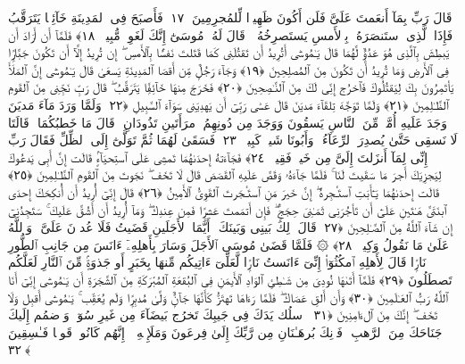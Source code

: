  قَالَ رَبِّ بِمَآ أَنعَمتَ عَلَىَّ فَلَن أَكُونَ ظَهِيرًۭا لِّلمُجرِمِينَ ﴿١٧﴾
 فَأَصبَحَ فِى ٱلمَدِينَةِ خَآئِفًۭا يَتَرَقَّبُ فَإِذَا ٱلَّذِى ٱستَنصَرَهُۥ بِٱلأَمسِ يَستَصرِخُهُۥ ۚ قَالَ لَهُۥ مُوسَىٰٓ إِنَّكَ لَغَوِىٌّۭ مُّبِينٌۭ ﴿١٨﴾
 فَلَمَّآ أَن أَرَادَ أَن يَبطِشَ بِٱلَّذِى هُوَ عَدُوٌّۭ لَّهُمَا قَالَ يَـٰمُوسَىٰٓ أَتُرِيدُ أَن تَقتُلَنِى كَمَا قَتَلتَ نَفسًۢا بِٱلأَمسِ ۖ إِن تُرِيدُ إِلَّآ أَن تَكُونَ جَبَّارًۭا فِى ٱلأَرضِ وَمَا تُرِيدُ أَن تَكُونَ مِنَ ٱلمُصلِحِينَ ﴿١٩﴾
 وَجَآءَ رَجُلٌۭ مِّن أَقصَا ٱلمَدِينَةِ يَسعَىٰ قَالَ يَـٰمُوسَىٰٓ إِنَّ ٱلمَلَأَ يَأتَمِرُونَ بِكَ لِيَقتُلُوكَ فَٱخرُج إِنِّى لَكَ مِنَ ٱلنَّـٰصِحِينَ ﴿٢٠﴾
 فَخَرَجَ مِنهَا خَآئِفًۭا يَتَرَقَّبُ ۖ قَالَ رَبِّ نَجِّنِى مِنَ ٱلقَومِ ٱلظَّـٰلِمِينَ ﴿٢١﴾
 وَلَمَّا تَوَجَّهَ تِلقَآءَ مَديَنَ قَالَ عَسَىٰ رَبِّىٓ أَن يَهدِيَنِى سَوَآءَ ٱلسَّبِيلِ ﴿٢٢﴾
 وَلَمَّا وَرَدَ مَآءَ مَديَنَ وَجَدَ عَلَيهِ أُمَّةًۭ مِّنَ ٱلنَّاسِ يَسقُونَ وَوَجَدَ مِن دُونِهِمُ ٱمرَأَتَينِ تَذُودَانِ ۖ قَالَ مَا خَطبُكُمَا ۖ قَالَتَا لَا نَسقِى حَتَّىٰ يُصدِرَ ٱلرِّعَآءُ ۖ وَأَبُونَا شَيخٌۭ كَبِيرٌۭ ﴿٢٣﴾
 فَسَقَىٰ لَهُمَا ثُمَّ تَوَلَّىٰٓ إِلَى ٱلظِّلِّ فَقَالَ رَبِّ إِنِّى لِمَآ أَنزَلتَ إِلَىَّ مِن خَيرٍۢ فَقِيرٌۭ ﴿٢٤﴾
 فَجَآءَتهُ إِحدَىٰهُمَا تَمشِى عَلَى ٱستِحيَآءٍۢ قَالَت إِنَّ أَبِى يَدعُوكَ لِيَجزِيَكَ أَجرَ مَا سَقَيتَ لَنَا ۚ فَلَمَّا جَآءَهُۥ وَقَصَّ عَلَيهِ ٱلقَصَصَ قَالَ لَا تَخَف ۖ نَجَوتَ مِنَ ٱلقَومِ ٱلظَّـٰلِمِينَ ﴿٢٥﴾
 قَالَت إِحدَىٰهُمَا يَـٰٓأَبَتِ ٱستَـٔجِرهُ ۖ إِنَّ خَيرَ مَنِ ٱستَـٔجَرتَ ٱلقَوِىُّ ٱلأَمِينُ ﴿٢٦﴾
 قَالَ إِنِّىٓ أُرِيدُ أَن أُنكِحَكَ إِحدَى ٱبنَتَىَّ هَـٰتَينِ عَلَىٰٓ أَن تَأجُرَنِى ثَمَـٰنِىَ حِجَجٍۢ ۖ فَإِن أَتمَمتَ عَشرًۭا فَمِن عِندِكَ ۖ وَمَآ أُرِيدُ أَن أَشُقَّ عَلَيكَ ۚ سَتَجِدُنِىٓ إِن شَآءَ ٱللَّهُ مِنَ ٱلصَّـٰلِحِينَ ﴿٢٧﴾
 قَالَ ذَٟلِكَ بَينِى وَبَينَكَ ۖ أَيَّمَا ٱلأَجَلَينِ قَضَيتُ فَلَا عُدوَٟنَ عَلَىَّ ۖ وَٱللَّهُ عَلَىٰ مَا نَقُولُ وَكِيلٌۭ ﴿٢٨﴾
 ۞ فَلَمَّا قَضَىٰ مُوسَى ٱلأَجَلَ وَسَارَ بِأَهلِهِۦٓ ءَانَسَ مِن جَانِبِ ٱلطُّورِ نَارًۭا قَالَ لِأَهلِهِ ٱمكُثُوٓا۟ إِنِّىٓ ءَانَستُ نَارًۭا لَّعَلِّىٓ ءَاتِيكُم مِّنهَا بِخَبَرٍ أَو جَذوَةٍۢ مِّنَ ٱلنَّارِ لَعَلَّكُم تَصطَلُونَ ﴿٢٩﴾
 فَلَمَّآ أَتَىٰهَا نُودِىَ مِن شَـٰطِئِ ٱلوَادِ ٱلأَيمَنِ فِى ٱلبُقعَةِ ٱلمُبَٰرَكَةِ مِنَ ٱلشَّجَرَةِ أَن يَـٰمُوسَىٰٓ إِنِّىٓ أَنَا ٱللَّهُ رَبُّ ٱلعَـٰلَمِينَ ﴿٣٠﴾
 وَأَن أَلقِ عَصَاكَ ۖ فَلَمَّا رَءَاهَا تَهتَزُّ كَأَنَّهَا جَآنٌّۭ وَلَّىٰ مُدبِرًۭا وَلَم يُعَقِّب ۚ يَـٰمُوسَىٰٓ أَقبِل وَلَا تَخَف ۖ إِنَّكَ مِنَ ٱلءَامِنِينَ ﴿٣١﴾
 ٱسلُك يَدَكَ فِى جَيبِكَ تَخرُج بَيضَآءَ مِن غَيرِ سُوٓءٍۢ وَٱضمُم إِلَيكَ جَنَاحَكَ مِنَ ٱلرَّهبِ ۖ فَذَٟنِكَ بُرهَـٰنَانِ مِن رَّبِّكَ إِلَىٰ فِرعَونَ وَمَلَإِي۟هِۦٓ ۚ إِنَّهُم كَانُوا۟ قَومًۭا فَـٰسِقِينَ ﴿٣٢﴾
